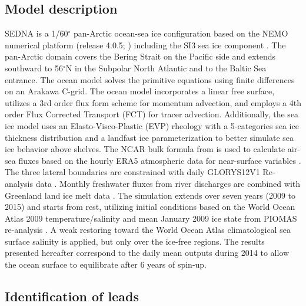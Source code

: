 \documentclass[draft]{agujournal2019}
\begin{document}
\subsection{Model description}

SEDNA is a 1/60$^\circ$ pan-Arctic ocean-sea ice configuration based on the NEMO numerical platform (release 4.0.5; ) including the SI3 sea ice component . The pan-Arctic domain covers the Bering Strait on the Pacific side and extends southward to 56$^\circ$N in the Subpolar North Atlantic and to the Baltic Sea entrance. The ocean model solves the primitive equations using finite differences on an Arakawa C-grid. The ocean model incorporates a linear free surface, utilizes a 3rd order flux form scheme for momentum advection, and employs a 4th order Flux Corrected Transport (FCT) for tracer advection. Additionally, the sea ice model uses an Elasto-Visco-Plastic (EVP) rheology with a 5-categories sea ice thickness distribution and a landfast ice parameterization to better simulate sea ice behavior above shelves. The NCAR bulk formula from  is used to calculate air-sea fluxes based on the hourly ERA5 atmospheric data for near-surface variables \cite{Hersbach_ERA5_2020}. The three lateral boundaries are constrained with daily GLORYS12V1 Re-analysis data \cite{GLORYS12}. Monthly freshwater fluxes from river discharges are combined with Greenland land ice melt data \cite{HuEA_rivers_2019}. The simulation extends over seven years (2009 to 2015) and starts from rest, utilizing initial conditions based on the World Ocean Atlas 2009 temperature/salinity and mean January 2009 ice state from PIOMAS re-analysis \cite{Locarnini_data_2010, PIOMAS}. A weak restoring toward the World Ocean Atlas climatological sea surface salinity is applied, but only over the ice-free regions. The results presented hereafter correspond to the daily mean outputs during 2014 to allow the ocean surface to equilibrate after 6 years of spin-up. %

\subsection{Identification of leads}
\end{document}
